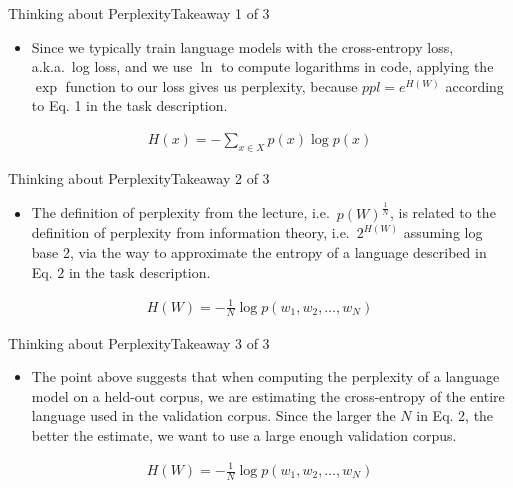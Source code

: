 \documentclass[t]{beamer}
\begin{document}
\begin{frame}{Thinking about Perplexity}{Takeaway 1 of 3}
    \begin{itemize}
        \item Since we typically train language models with the cross-entropy
              loss, a.k.a.\ log loss, and we use $\ln$ to compute logarithms in
              code, applying the $\exp$ function to our loss gives us
              perplexity, because $ppl = e^{H(W)}$ according to Eq. 1 in the
              task description.
    \end{itemize}
    \begin{align*}
        H(x) = -\sum_{x\in X} p(x)\log p(x)
    \end{align*}
\end{frame}

\begin{frame}{Thinking about Perplexity}{Takeaway 2 of 3}
    \begin{itemize}
        \item The definition of perplexity from the lecture, i.e.\
              $p(W)^{\frac{1}{N}}$, is related to the definition of perplexity
              from information theory, i.e.\ $2^{H(W)}$ assuming log base 2, via
              the way to approximate the entropy of a language described in
              Eq. 2 in the task description.
    \end{itemize}
    \begin{align*}
        H(W) = -\frac{1}{N} \log p(w_1,w_2,\ldots,w_N)
    \end{align*}
\end{frame}

\begin{frame}{Thinking about Perplexity}{Takeaway 3 of 3}
    \begin{itemize}
        \item The point above suggests that when computing the perplexity of a
              language model on a held-out corpus, we are estimating the
              cross-entropy of the entire language used in the validation
              corpus.
              Since the larger the $N$ in Eq. 2, the better the estimate, we
              want to use a large enough validation corpus.
    \end{itemize}
    \begin{align*}
        H(W) = -\frac{1}{N} \log p(w_1,w_2,\ldots,w_N)
    \end{align*}
\end{frame}
\end{document}
